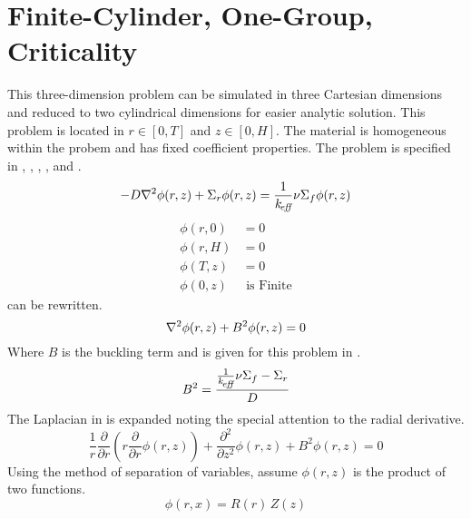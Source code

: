 \section{Finite-Cylinder, One-Group, Criticality}
  \label{sec:deriv_finite_cyl}
  This three-dimension problem can be simulated in three Cartesian dimensions 
  and reduced to two cylindrical dimensions for easier analytic solution. This
  problem is located in $r \in [0,T]$ and $z \in [0,H]$. The material is
  homogeneous within the probem and has fixed coefficient properties. The
  problem is specified in , ,
  , , and
  .
  \begin{equation}
    \label{eq:finite_cyl}
    -D \mathbf{\nabla}^2 \phi(r,z) + \Sigma_r \phi(r,z) = \frac{1}{k_{\!\mbox{\scriptsize \em eff}}} \nu \Sigma_f
      \phi(r,z)
  \end{equation}
  \begin{align}
    \label{eq:finite_cyl_bcz0}
    \phi(r,0) &= 0 \\
    \label{eq:finite_cyl_bczH}
    \phi(r,H) &= 0 \\
    \label{eq:finite_cyl_bcrT}
    \phi(T,z) &= 0 \\
    \label{eq:finite_cyl_bcr0}
    \phi(0,z) & \text{ is Finite}
  \end{align}
   can be rewritten. 
  \begin{equation}
    \label{eq:finite_cyl_buckle}
    \mathbf{\nabla}^2 \phi(r,z) + B^2 \phi(r,z) = 0
  \end{equation}
  Where $B$ is the buckling term and is given for this problem in
  .
  \begin{equation}
    \label{eq:finite_cyl_b2}
    B^2 = \frac{\frac{1}{k_{\!\mbox{\scriptsize \em eff}}} \nu \Sigma_f - \Sigma_r }{D}
  \end{equation}
  The Laplacian in  is expanded noting the special
  attention to the radial derivative.
  \begin{equation}
    \label{eq:finite_cyl_deriv}
    \frac{1}{r} \frac{\partial}{\partial r} \left( r \frac{\partial}{\partial r}
      \phi(r,z) \right) + \frac{\partial^2}{\partial z^2} \phi(r,z) + 
      B^2 \phi(r,z) = 0
  \end{equation}
  Using the method of separation of variables, assume $\phi(r,z)$ is the product
  of two functions.
  \begin{equation}
    \label{eq:finite_cyl_separation}
    \phi(r,x) = R(r) \, Z(z)
  \end{equation}
